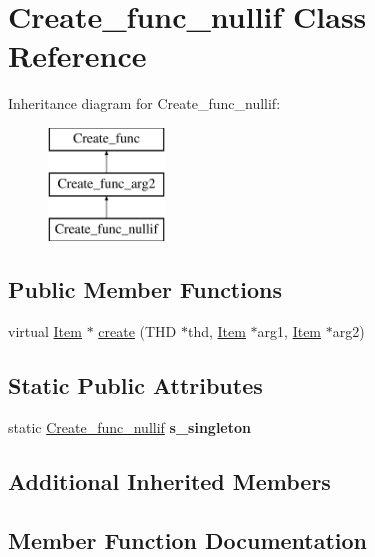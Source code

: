 \hypertarget{classCreate__func__nullif}{}\section{Create\+\_\+func\+\_\+nullif Class Reference}
\label{classCreate__func__nullif}
Inheritance diagram for Create\+\_\+func\+\_\+nullif\+:\begin{figure}[H]
\begin{center}
\leavevmode
\includegraphics[height=3.000000cm]{classCreate__func__nullif}
\end{center}
\end{figure}
\subsection*{Public Member Functions}
\begin{DoxyCompactItemize}
\item 
virtual \mbox{\hyperlink{classItem}{Item}} $\ast$ \mbox{\hyperlink{classCreate__func__nullif_a439ab54953324f20d51735c6a09fe61b}{create}} (T\+HD $\ast$thd, \mbox{\hyperlink{classItem}{Item}} $\ast$arg1, \mbox{\hyperlink{classItem}{Item}} $\ast$arg2)
\end{DoxyCompactItemize}
\subsection*{Static Public Attributes}
\begin{DoxyCompactItemize}
\item 
\mbox{\label{classCreate__func__nullif_a3a80a8c09b805f57d2c1c9c7161abe08}} 
static \mbox{\hyperlink{classCreate__func__nullif}{Create\+\_\+func\+\_\+nullif}} {\bfseries s\+\_\+singleton}
\end{DoxyCompactItemize}
\subsection*{Additional Inherited Members}


\subsection{Member Function Documentation}
\mbox{\label{classCreate__func__nullif_a439ab54953324f20d51735c6a09fe61b}} 
